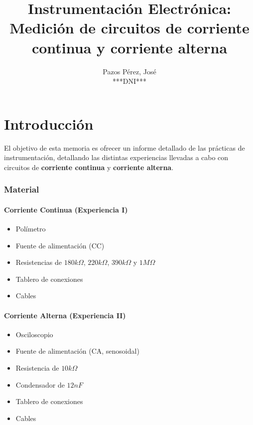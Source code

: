 \documentclass[12pt, a4paper, titlepage]{article}
\title{\textbf {Instrumentación Electrónica: Medición de circuitos de corriente continua y corriente alterna}}
\author{{\Large Pazos Pérez, José}\\***DNI***}
\date{}
\begin{document}
  \maketitle

  \tableofcontents

  \newpage
  \part*{Introducción}

  El objetivo de esta memoria es ofrecer un informe detallado de las prácticas de instrumentación, detallando las distintas experiencias llevadas a cabo con circuitos de \textbf{corriente continua} y \textbf{corriente alterna}.

  \section{Material}

  \subsection{Corriente Continua (Experiencia I)}

  \begin{itemize}[label=$-$]
    \item Polímetro
    \item Fuente de alimentación (CC)
    \item Resistencias de $180k\Omega$, $220k\Omega$, $390k\Omega$ y $1M\Omega$
    \item Tablero de conexiones
    \item Cables
  \end{itemize}

  \subsection{Corriente Alterna (Experiencia II)}
  \begin{itemize}[label=$-$]
    \item Osciloscopio
    \item Fuente de alimentación (CA, senosoidal)
    \item Resistencia de $10k\Omega$
    \item Condensador de $12nF$
    \item Tablero de conexiones
    \item Cables
  \end{itemize}
\end{document}
